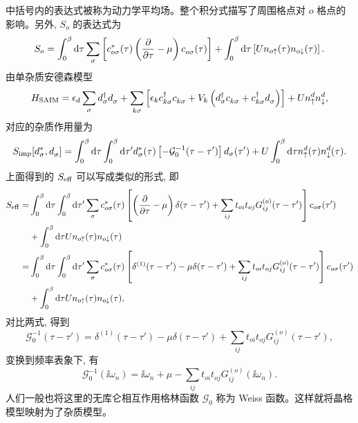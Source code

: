 中括号内的表达式被称为动力学平均场。整个积分式描写了周围格点对 $o$ 格点的影响。另外, $S_o$ 的表达式为 
\begin{equation}
    S_o=\int_0^\beta\mathrm{d}\tau\sum_\sigma\left[ c_{o\sigma}^*(\tau)\left( \frac{\partial}{\partial \tau}-\mu \right) c_{o\sigma}^{ }(\tau) \right]+\int_0^\beta\mathrm{d}\tau\left[ U n_{o\uparrow}(\tau)n_{o\downarrow}(\tau) \right].
\end{equation} 
由单杂质安德森模型 
\begin{equation}
    H_{\mathrm{SAIM}}=\epsilon_d\sum_\sigma d_\sigma^\dagger d_\sigma^{ }+\sum_{k\sigma}\left[ \epsilon_k c_{k\sigma}^{\dagger} c_{k\sigma}^{ }+V_k\left( d_\sigma^\dagger c_{k\sigma}^{ }+c_{k\sigma}^\dagger d_\sigma^{ } \right) \right]+U n_{\uparrow}^d n_{\downarrow}^d, 
\end{equation}
对应的杂质作用量为 
\begin{equation}
    S_{\mathrm{imp}}[d_\sigma^*,d_\sigma^{ }]=\int_0^\beta\mathrm{d}\tau\int_0^\beta\mathrm{d}\tau'd_\sigma^*(\tau)\left[ -\mathcal{G}^{-1}_0(\tau-\tau') \right] d_{\sigma}(\tau')+U\int_0^\beta\mathrm{d}\tau n_{\uparrow}^d(\tau)n_{\downarrow}^d(\tau).
\end{equation}
上面得到的 $S_{\mathrm{eff}}$ 可以写成类似的形式, 即
\begin{equation}
    \begin{aligned}
        S_{\mathrm{eff}}=&\int_0^\beta\mathrm{d}\tau \int_0^\beta\mathrm{d}\tau'\sum_\sigma c_{o\sigma}^*(\tau)\left[ \left( \frac{\partial}{\partial \tau}-\mu \right)\delta(\tau-\tau')+\sum_{ij}t_{oi}t_{oj}G_{ij}^{(o)}(\tau-\tau') \right] c_{o\sigma}(\tau')\\
        & +\int_0^\beta\mathrm{d}\tau Un_{o\uparrow}(\tau)n_{o\downarrow}(\tau)\\
        =&\int_0^\beta\mathrm{d}\tau \int_0^\beta\mathrm{d}\tau'\sum_\sigma c_{o\sigma}^*(\tau)\left[ \delta^{(1)}(\tau-\tau')-\mu\delta(\tau-\tau') +\sum_{ij}t_{oi}t_{oj}G_{ij}^{(o)}(\tau-\tau') \right] c_{o\sigma}(\tau')\\
        &+\int_0^\beta\mathrm{d}\tau Un_{o\uparrow}(\tau)n_{o\downarrow}(\tau),
    \end{aligned}
\end{equation}
对比两式, 得到 
\begin{equation}
    \mathcal{G}_0^{-1}(\tau-\tau')=\delta^{(1)}(\tau-\tau')-\mu\delta(\tau-\tau') +\sum_{ij}t_{oi}t_{oj}G_{ij}^{(o)}(\tau-\tau'),
\end{equation}
变换到频率表象下, 有 
\begin{equation}
    \mathcal{G}_0 ^{-1}(\ii\omega_n)=\ii\omega_n+\mu-\sum_{ij}t_{oi}t_{oj}G_{ij}^{(o)}(\ii\omega_n).\label{weiss-eq}
\end{equation}
人们一般也将这里的无库仑相互作用格林函数 $\mathcal{G}_0$ 称为 Weiss 函数。这样就将晶格模型映射为了杂质模型。

